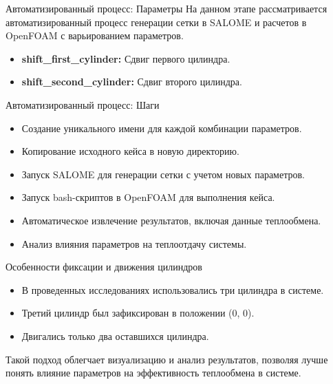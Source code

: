 \documentclass{beamer}
\begin{document}
\begin{frame}{Автоматизированный процесс: Параметры}
	На данном этапе рассматривается автоматизированный процесс генерации сетки в SALOME и расчетов в OpenFOAM с варьированием параметров.

	\begin{itemize}[label=•]
		\item \textbf{shift\_first\_cylinder:} Сдвиг первого цилиндра.
		\item \textbf{shift\_second\_cylinder:} Сдвиг второго цилиндра.
	\end{itemize}
\end{frame}

\begin{frame}{Автоматизированный процесс: Шаги}
	\begin{itemize}[label=•]
		\item Создание уникального имени для каждой комбинации параметров.
		\item Копирование исходного кейса в новую директорию.
		\item Запуск SALOME для генерации сетки с учетом новых параметров.
		\item Запуск bash-скриптов в OpenFOAM для выполнения кейса.
		\item Автоматическое извлечение результатов, включая данные теплообмена.
		\item Анализ влияния параметров на теплоотдачу системы.
	\end{itemize}
\end{frame}

\begin{frame}{Особенности фиксации и движения цилиндров}
	\begin{itemize}[label=•]
		\item В проведенных исследованиях использовались три цилиндра в системе.
		\item Третий цилиндр был зафиксирован в положении (0, 0).
		\item Двигались только два оставшихся цилиндра.
	\end{itemize}

	\vspace{1em}
	Такой подход облегчает визуализацию и анализ результатов, позволяя лучше понять влияние параметров на эффективность теплообмена в системе.
\end{frame}
\end{document}
